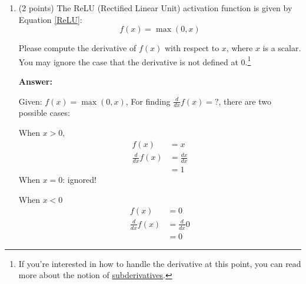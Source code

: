 \documentclass{article}
\newenvironment{answer}{
    {\bf Answer:} \sf \begingroup\color{red}
}{\endgroup}%
\begin{document}
\begin{enumerate}[label=(\alph*)]
\begin{shaded}
\begin{answer}
\begin{equation*}
\begin{split}
\frac{\partial}{\partial \bm U}\bm J_{\text{naive-softmax}}(\bm v_c, o, \bm U) & = \Bigg[ \frac{\partial \bm J(\bm v_c,o,\bm U)}{\partial \bm u_1} , \frac{\partial \bm J(\bm v_c,o,\bm U)}{\partial \bm u_2},...,\frac{\partial \bm J(\bm v_c,o,\bm U)}{\partial \bm u_{|Vocab|}}\Bigg]\\
& = \boxed{ \big[ \bm \hat {\bm y}_{ \bm u_1 \neq o} \cdot \bm v_c, \; \bm \hat {\bm y}_{\bm u_2 \neq o} \cdot \bm v_c,..., (\bm \hat{\bm y}_{ \bm u_k=o} - 1) \cdot \bm v_c ,...,\; \bm \hat {\bm y}_{\bm u_{|Vocab|} \neq o} \cdot \bm v_c \big]}\\
& \text{where $k$ is an arbitrary index representing}\; k\textsuperscript{th}\; \text{outside word equal to $o$.}
\end{split}
\end{equation*}

\end{answer}
\end{shaded}

\item (2 points) The ReLU (Rectified Linear Unit) activation function is given by Equation \ref{ReLU}:
\begin{equation}
    \label{ReLU}
    f(x) = \max(0, x)
\end{equation}

Please compute the derivative of $f(x)$ with respect to $x$, where $x$ is a scalar. You may ignore the case that the derivative is not defined at 0.\footnote{If you're interested in how to handle the derivative at this point, you can read more about the notion of \hyperref[https://en.wikipedia.org/wiki/Subderivative]{subderivatives}.}

\begin{shaded}
\begin{answer}
Given: $f(x) = \max(0, x)$, For finding $\frac{d}{d x} f(x)=?$, there are two possible cases:

When $x>0$,
\begin{equation*}
\begin{split}
f(x)&=x\\
\frac{d}{d x} f(x) &= \frac{d x}{d x}\\
&=\boxed{1}
\end{split}
\end{equation*}
When $x=0$: ignored!

When $x<0$
\begin{equation*}
\begin{split}
f(x)&=0\\
\frac{d}{d x} f(x) &= \frac{d}{d x} 0\\
&=\boxed{0}
\end{split}
\end{equation*}
\end{answer}
\end{shaded}


\end{enumerate}
\end{document}
